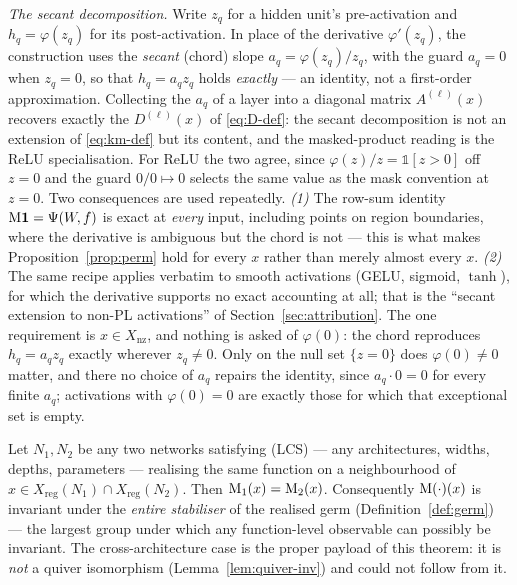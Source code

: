 \begin{clarifybox}
\emph{The secant decomposition.} Write $z_q$ for a hidden unit's pre-activation
and $h_q=\varphi(z_q)$ for its post-activation. In place of the derivative
$\varphi'(z_q)$, the construction uses the \emph{secant} (chord) slope
$a_q=\varphi(z_q)/z_q$, with the guard $a_q=0$ when $z_q=0$, so that
$h_q=a_qz_q$ holds \emph{exactly} --- an identity, not a first-order
approximation. Collecting the $a_q$ of a layer into a diagonal matrix
$A^{(\ell)}(x)$ recovers exactly the $D^{(\ell)}(x)$ of \eqref{eq:D-def}: the
secant decomposition is not an extension of \eqref{eq:km-def} but its content,
and the masked-product reading is the ReLU specialisation. For ReLU the two agree,
since $\varphi(z)/z=\mathbb 1[z>0]$ off $z=0$ and the guard $0/0\mapsto0$
selects the same value as the mask convention at $z=0$. Two consequences are
used repeatedly. \emph{(1)} The row-sum identity $\mathrm{M}\mathbf 1=\Psi(W\!,f)$ is exact at
\emph{every} input, including points on region boundaries, where the
derivative is ambiguous but the chord is not --- this is what makes
Proposition~\ref{prop:perm} hold for every $x$ rather than merely almost
every $x$. \emph{(2)} The same recipe applies verbatim to smooth activations
(GELU, sigmoid, $\tanh$), for which the derivative supports no exact
accounting at all; that is the ``secant extension to non-PL activations'' of
Section~\ref{sec:attribution}. The one requirement is $x\in X_{\mathrm{nz}}$,
and nothing is asked of $\varphi(0)$: the chord reproduces $h_q=a_qz_q$ exactly
wherever $z_q\neq0$. Only on the null set $\{z=0\}$ does $\varphi(0)\neq0$
matter, and there no choice of $a_q$ repairs the identity, since $a_q\cdot0=0$
for every finite $a_q$; activations with $\varphi(0)=0$ are exactly those for
which that exceptional set is empty.
\end{clarifybox}

\begin{theorem}\label{thm:maxinv}
Let $N_1,N_2$ be any two networks satisfying (LCS) --- any architectures,
widths, depths, parameters --- realising the same function on a neighbourhood of
$x\in X_{\mathrm{reg}}(N_1)\cap X_{\mathrm{reg}}(N_2)$. Then
$\mathrm{M}_1(x)=\mathrm{M}_2(x)$. Consequently $\mathrm{M}(\cdot)(x)$ is invariant under the
\emph{entire stabiliser} of the realised germ (Definition~\ref{def:germ}) ---
the largest group under which any function-level observable can possibly be
invariant. The cross-architecture case is the proper payload of this theorem:
it is \emph{not} a quiver isomorphism (Lemma~\ref{lem:quiver-inv}) and could
not follow from it.
\end{theorem}


